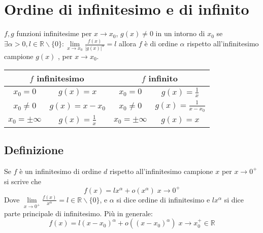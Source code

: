 \section{Ordine di infinitesimo e di infinito}
$f,g$ funzioni infinitesime per $x\rightarrow x_0$, $g(x)\neq 0$ in un intorno di $x_0$ se $\exists\alpha>0, l\in\mathbb{R}\backslash\{0\}:\lim\limits_{x\rightarrow x_0}
\frac{f(x)}{|g(x)|^\alpha}=l$ allora $f$ \`e di ordine $\alpha$ rispetto all'infinitesimo campione $g(x)$ , per $x\rightarrow x_0$.\\ 
\begin{tabular}{|c c|c c|}
\hline
\multicolumn{2}{|c|}{$f$ infinitesimo} & \multicolumn{2}{c|}{$f$ infinito}\\
\hline
$x_0=0$&$g(x)=x$& $x_0=0$ & $g(x)=\frac{1}{x}$\\
$x_0\neq 0$&$g(x)=x-x_0$& $x_0\neq 0$ & $g(x)=\frac{1}{x-x_0}$\\
$x_0=\pm\infty$&$g(x)=\frac{1}{x}$& $x_0=\pm\infty$ & $g(x)=x$\\
\hline
\end{tabular}
\subsection{Definizione}
Se $f$ \`e un infinitesimo di ordine $d$ rispetto all'infinitesimo campione $x$ per $x\rightarrow 0^+$ si scrive che
\begin{equation}
f(x)=lx^\alpha+o(x^\alpha)\;x\rightarrow 0^+
\end{equation}
Dove $\lim\limits_{x\rightarrow 0^+}\frac{f(x)}{x^\alpha}=l\in\mathbb{R}\backslash\{0\}$, e $\alpha$ si dice ordine di infinitesimo e $lx^\alpha$ si dice parte principale
di infinitesimo. Pi\`u in generale:
\begin{equation}
f(x)=l(x-x_0)^\alpha+o((x-x_0)^\alpha)\;x\rightarrow x_0^+\in\mathbb{R}
\end{equation} 
